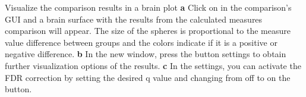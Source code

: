 \documentclass[justified]{tufte-handout}
\begin{document}
 	{Visualize the comparison results in a brain plot}
 	{
 	{\bf a} Click on  in the comparison's GUI and a brain surface with the results from the calculated measures comparison will appear. The size of the spheres is proportional to the measure value difference between groups and the colors indicate if it is a positive or negative difference.   
        {\bf b} In the new window, press the button settings to obtain further visualization options of the results. 
        {\bf c} In the settings, you can activate the FDR correction by setting the desired q value and changing from off to on the button.
        }
\end{document}
